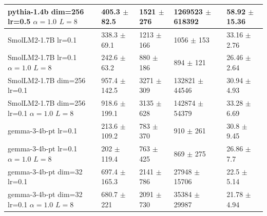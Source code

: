 \begin{table}[]
\begin{small}
\begin{tabular}{lllll}
     pythia-1.4b {\small dim=256} {\small lr=0.5} {\small $\alpha=1.0$} {\small $L=8$}  & 405.3 {\small $\pm$ 82.5}   & 1521 {\small $\pm$ 276}  & 1269523 {\small $\pm$ 618392} & 58.92 {\small $\pm$ 15.36} \\
     \midrule
     SmolLM2-1.7B {\small lr=0.1}                                                       & 338.3 {\small $\pm$ 69.1}   & 1213 {\small $\pm$ 166}  & 1056 {\small $\pm$ 153}       & 33.16 {\small $\pm$ 2.76}  \\
     SmolLM2-1.7B {\small lr=0.1} {\small $\alpha=1.0$} {\small $L=8$}                  & 242.6 {\small $\pm$ 63.2}   & 880 {\small $\pm$ 186}   & 894 {\small $\pm$ 121}        & 26.46 {\small $\pm$ 2.64}  \\
     SmolLM2-1.7B {\small dim=256} {\small lr=0.1}                                      & 957.4 {\small $\pm$ 142.5}  & 3271 {\small $\pm$ 309}  & 132821 {\small $\pm$ 44546}   & 30.94 {\small $\pm$ 4.93}  \\
     SmolLM2-1.7B {\small dim=256} {\small lr=0.1} {\small $\alpha=1.0$} {\small $L=8$} & 918.6 {\small $\pm$ 199.1}  & 3135 {\small $\pm$ 628}  & 142874 {\small $\pm$ 54379}   & 33.28 {\small $\pm$ 6.69}  \\
     \midrule
     gemma-3-4b-pt {\small lr=0.1}                                                      & 213.6 {\small $\pm$ 109.2}  & 783 {\small $\pm$ 370}   & 910 {\small $\pm$ 261}        & 30.8 {\small $\pm$ 9.45}   \\
     gemma-3-4b-pt {\small lr=0.1} {\small $\alpha=1.0$} {\small $L=8$}                 & 202 {\small $\pm$ 119.4}    & 763 {\small $\pm$ 425}   & 869 {\small $\pm$ 275}        & 26.86 {\small $\pm$ 7.7}   \\
     gemma-3-4b-pt {\small dim=32} {\small lr=0.1}                                      & 697.4 {\small $\pm$ 165.3}  & 2141 {\small $\pm$ 786}  & 27948 {\small $\pm$ 15706}    & 22.5 {\small $\pm$ 5.14}   \\
     gemma-3-4b-pt {\small dim=32} {\small lr=0.1} {\small $\alpha=1.0$} {\small $L=8$} & 680.7 {\small $\pm$ 221}    & 2091 {\small $\pm$ 730}  & 35384 {\small $\pm$ 29987}    & 21.78 {\small $\pm$ 4.94}  \\


        \hline
    \end{tabular}
    \end{small}

\end{table}



